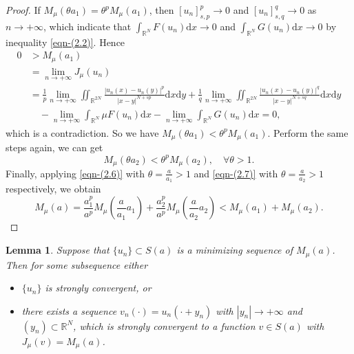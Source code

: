 \documentclass[10pt,a4paper]{amsart}
\numberwithin{equation}{section}
\newtheorem{lemma}[theorem]{Lemma}
\begin{document}
\begin{proof}
If $M_\mu(\theta a_1)={\theta}^{p}M_\mu(a_1)$, then $[u_n]_{s,p}^{p}\to 0$ and 
$[u_n]_{s,q}^{q}\to 0$ as $n\to +\infty$,
which indicate that $\int_{\mathbb{R}^N}F(u_n)\mathrm{d}x\to 0 $ and 
$\int_{\mathbb{R}^N}G(u_n)\mathrm{d}x\to 0 $ by inequality \eqref{eqn-(2.2)}. Hence
\begin{align*}
0&>M_\mu(a_1)\\
&= \lim\limits_{n\to +\infty}J_\mu(u_n)\\
&= \frac{1}{p}\lim\limits_{n\to +\infty}\iint_{\mathbb{R}^{2N}}\frac{|u_n(x)-u_n(y)|^{p}}{|x-y|^{N+sp}}\mathrm{d}x\mathrm{d}y+\frac{1}{q}\lim\limits_{n\to +\infty}\iint_{\mathbb{R}^{2N}}\frac{|u_n(x)-u_n(y)|^{q}}{|x-y|^{N+sq}}\mathrm{d}x\mathrm{d}y\\
&\quad -\lim\limits_{n\to +\infty}\int_{\mathbb{R}^N}\mu F(u_n)\mathrm{d}x
 -\lim\limits_{n\to +\infty}\int_{\mathbb{R}^N} G(u_n)\mathrm{d}x
= 0,
\end{align*}
which is a contradiction. So we have $M_\mu(\theta a_1)<{\theta}^{p}M_\mu(a_1)$.
Perform the same steps again, we can get
\begin{equation}\label{eqn-(2.7)}
M_\mu(\theta a_2)<{\theta}^{p}M_\mu(a_2),\quad\forall\theta>1.
\end{equation}
Finally, applying \eqref{eqn-(2.6)} with $\theta=\frac{a}{a_1}>1$ 
and \eqref{eqn-(2.7)} with $\theta=\frac{a}{a_2}>1$ respectively, we obtain
$$
M_\mu(a)=\frac{a_1^{p}}{a^{p}}M_\mu(\frac{a}{a_1}a_1)
+\frac{a_2^{p}}{a^{p}}M_\mu(\frac{a}{a_2}a_2)<M_\mu(a_1)+M_\mu(a_2).
$$
\end{proof}

\begin{lemma}\label{pro:2.1}
Suppose that $\{u_n\}\subset S(a)$ is a minimizing sequence of $M_\mu(a)$. 
Then  for some subsequence either
\begin{itemize}
\item[(i)] $\{u_n\}$ is strongly convergent,
or
\item[(ii)] there exists a sequence $v_n(\cdot)=u_n(\cdot+y_n)$ with 
$|y_n|\to+\infty$ and $(y_n)\subset\mathbb{R}^N$, which is strongly 
convergent to a function $v\in S(a)$ with $J_\mu(v)=M_\mu(a)$.
\end{itemize}
\end{lemma}
\end{document}
